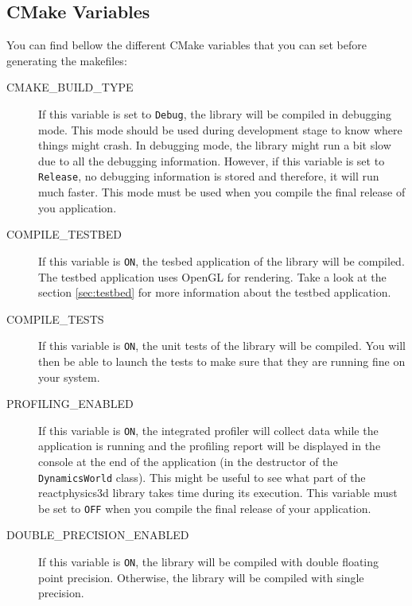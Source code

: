 \documentclass[a4paper,12pt]{article}
\begin{document}
     \subsection{CMake Variables}
     \label{sec:cmakevariables}

     You can find bellow the different CMake variables that you can set before generating the makefiles:

       \begin{description}
         \item[CMAKE\_BUILD\_TYPE] If this variable is set to \texttt{Debug}, the library will be compiled in debugging mode.
                                                    This mode should be used during development stage to know where things might crash.
                                                    In debugging mode, the library might run a bit slow due to all the debugging information.
                                                    However, if this variable is set to \texttt{Release}, no debugging information is stored
                                                    and therefore, it will run much faster. This mode must be used when you compile the final
                                                    release of you application.

         \item[COMPILE\_TESTBED] If this variable is \texttt{ON}, the tesbed application of the library will be compiled.
                                                         The testbed application uses OpenGL for rendering.
                                                         Take a look at the section \ref{sec:testbed} for more information about the testbed application.

         \item[COMPILE\_TESTS] If this variable is \texttt{ON}, the unit tests of the library will be compiled. You will then
                                             be able to launch the tests to make sure that they are running fine on your system.

          \item[PROFILING\_ENABLED] If this variable is \texttt{ON}, the integrated profiler will collect data while the application is running
                                                      and the profiling report will be displayed in the console at the end of the application (in the
                                                      destructor of the \texttt{DynamicsWorld} class). This might be useful to see what part of the reactphysics3d
                                                      library takes time during its execution. This variable must be set to \texttt{OFF} when you compile
                                                      the final release of your application.

          \item[DOUBLE\_PRECISION\_ENABLED] If this variable is \texttt{ON}, the library will be compiled with double floating point precision.
                                                                    Otherwise, the library will be compiled with single precision.
       \end{description}
\end{document}
